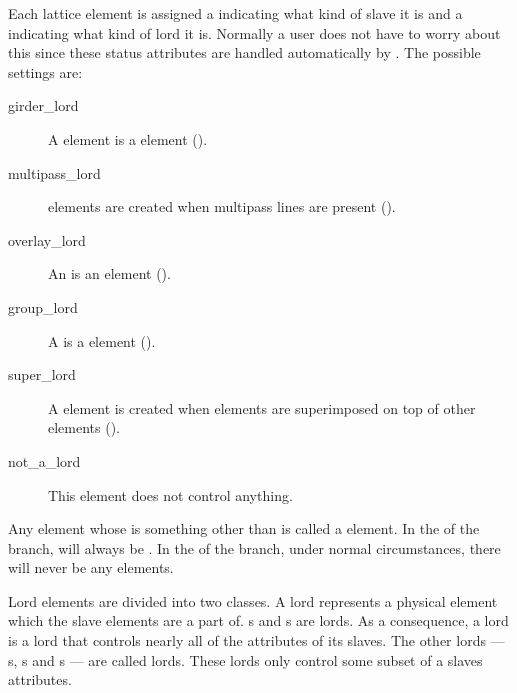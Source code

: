 Each lattice element is assigned a  indicating what kind of slave it is and a
 indicating what kind of lord it is. Normally a user does not have to worry about
this since these status attributes are handled automatically by \bmad.  The possible
 settings are:
  \begin{description}
  \item[girder_lord]\Newline 
A  element is a  element  (). 
  \item[multipass_lord]\Newline
{} elements are created when
multipass lines are present (). 
  \item[overlay_lord]\Newline 
An  is an  element (). 
  \item[group_lord]\Newline 
A  is a  element ().
  \item[super_lord]\Newline 
A  element is created when elements are
superimposed on top of other elements ().
  \item[not_a_lord]\Newline
This element does not control anything.
  \end{description}
Any element whose  is something other than
 is called a  element. In the 
of the branch,  will always be
. In the  of the branch, under normal
circumstances, there will never be any  elements.

Lord elements are divided into two classes.  A  lord represents a physical element which
the slave elements are a part of.  s and s are  lords.
As a consequence, a  lord is a lord that controls nearly all of the attributes of its
slaves.  The other lords --- s, s and s --- are
called  lords.  These lords only control some subset of a slaves attributes.

